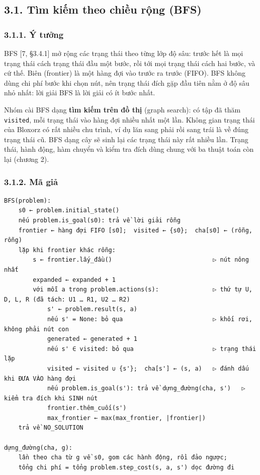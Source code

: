 \subsection{3.1. Tìm kiếm theo chiều rộng (BFS)}

\subsubsection{3.1.1. Ý tưởng}

BFS {[}7, §3.4.1{]} mở rộng các trạng thái theo từng lớp độ sâu: trước hết là mọi trạng thái cách trạng thái đầu một bước, rồi tới mọi trạng thái cách hai bước, và cứ thế. Biên (frontier) là một hàng đợi vào trước ra trước (FIFO). BFS không dùng chi phí bước khi chọn nút, nên trạng thái đích gặp đầu tiên nằm ở độ sâu nhỏ nhất: lời giải BFS là lời giải có ít bước nhất.

Nhóm cài BFS dạng \textbf{tìm kiếm trên đồ thị} (graph search): có tập đã thăm \texttt{visited}, mỗi trạng thái vào hàng đợi nhiều nhất một lần. Không gian trạng thái của Bloxorz có rất nhiều chu trình, ví dụ lăn sang phải rồi sang trái là về đúng trạng thái cũ. BFS dạng cây sẽ sinh lại các trạng thái này rất nhiều lần. Trạng thái, hành động, hàm chuyển và kiểm tra đích dùng chung với ba thuật toán còn lại (chương 2).

\subsubsection{3.1.2. Mã giả}

\begin{verbatim}
BFS(problem):
    s0 ← problem.initial_state()
    nếu problem.is_goal(s0): trả về lời giải rỗng
    frontier ← hàng đợi FIFO [s0];  visited ← {s0};  cha[s0] ← (rỗng, rỗng)
    lặp khi frontier khác rỗng:
        s ← frontier.lấy_đầu()                            ▷ nút nông nhất
        expanded ← expanded + 1
        với mỗi a trong problem.actions(s):               ▷ thứ tự U, D, L, R (đã tách: U1 … R1, U2 … R2)
            s' ← problem.result(s, a)
            nếu s' = None: bỏ qua                         ▷ khối rơi, không phải nút con
            generated ← generated + 1
            nếu s' ∈ visited: bỏ qua                      ▷ trạng thái lặp
            visited ← visited ∪ {s'};  cha[s'] ← (s, a)   ▷ đánh dấu khi ĐƯA VÀO hàng đợi
            nếu problem.is_goal(s'): trả về dựng_đường(cha, s')   ▷ kiểm tra đích khi SINH nút
            frontier.thêm_cuối(s')
            max_frontier ← max(max_frontier, |frontier|)
    trả về NO_SOLUTION

dựng_đường(cha, g):
    lần theo cha từ g về s0, gom các hành động, rồi đảo ngược;
    tổng chi phí = tổng problem.step_cost(s, a, s') dọc đường đi
\end{verbatim}

